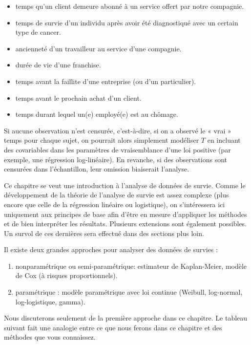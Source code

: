 \documentclass[
  11pt,
  letterpaper,
]{book}
\providecommand{\tightlist}{%
  \setlength{\itemsep}{0pt}\setlength{\parskip}{0pt}}
\theoremstyle{definition}
\theoremstyle{definition}
\theoremstyle{definition}
\theoremstyle{remark}
\begin{document}
\begin{itemize}
\tightlist
\item
  temps qu'un client demeure abonné à un service offert par notre compagnie.
\item
  temps de survie d'un individu après avoir été diagnostiqué avec un certain type de cancer.
\item
  ancienneté d'un travailleur au service d'une compagnie.
\item
  durée de vie d'une franchise.
\item
  temps avant la faillite d'une entreprise (ou d'un particulier).
\item
  temps avant le prochain achat d'un client.
\item
  temps durant lequel un(e) employé(e) est au chômage.
\end{itemize}

Si aucune observation n'est censurée, c'est-à-dire, si on a observé le « vrai » temps pour chaque sujet, on pourrait alors simplement modéliser \(T\) en incluant des covariables dans les paramètres de vraisemblance d'une loi positive (par exemple, une régression log-linéaire). En revanche, si des observations sont censurées dans l'échantillon, leur omission biaiserait l'analyse.

Ce chapitre se veut une introduction à l'analyse de données de survie. Comme le développement de la théorie de l'analyse de survie est assez complexe (plus encore que celle de la régression linéaire ou logistique), on s'intéressera ici uniquement aux principes de base afin d'être en mesure d'appliquer les méthodes et de bien interpréter les résultats. Plusieurs extensions sont également possibles. Un survol de ces dernières sera effectué dans des sections plus loin.

Il existe deux grandes approches pour analyser des données de survies :

\begin{enumerate}
\def\labelenumi{\roman{enumi})}
\tightlist
\item
  nonparamétrique ou semi-paramétrique: estimateur de Kaplan-Meier, modèle de Cox (à risques proportionnels).
\item
  paramétrique : modèle paramétrique avec loi continue (Weibull, log-normal, log-logistique, gamma).
\end{enumerate}

Nous discuterons seulement de la première approche dans ce chapitre. Le tableau suivant fait une analogie entre ce que nous ferons dans ce chapitre et des méthodes que vous connaissez.
\end{document}
